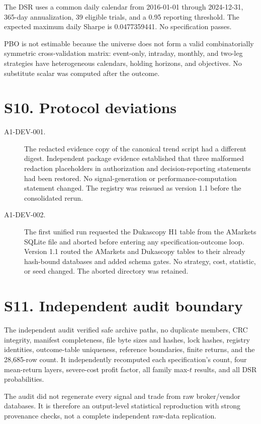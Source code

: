 \documentclass[a4paper,fleqn]{cas-sc}
\begin{document}
The DSR uses a common daily calendar from 2016-01-01 through 2024-12-31, 365-day annualization, 39 eligible trials, and a 0.95 reporting threshold. The expected maximum daily Sharpe is 0.0477359441. No specification passes.



PBO is not estimable because the universe does not form a valid combinatorially symmetric cross-validation matrix: event-only, intraday, monthly, and two-leg strategies have heterogeneous calendars, holding horizons, and objectives. No substitute scalar was computed after the outcome.

\section*{S10. Protocol deviations}

\begin{description}
\item[A1-DEV-001.] The redacted evidence copy of the canonical trend script had a different digest. Independent package evidence established that three malformed redaction placeholders in authorization and decision-reporting statements had been restored. No signal-generation or performance-computation statement changed. The registry was reissued as version 1.1 before the consolidated rerun.
\item[A1-DEV-002.] The first unified run requested the Dukascopy H1 table from the AMarkets SQLite file and aborted before entering any specification-outcome loop. Version 1.1 routed the AMarkets and Dukascopy tables to their already hash-bound databases and added schema gates. No strategy, cost, statistic, or seed changed. The aborted directory was retained.
\end{description}

\section*{S11. Independent audit boundary}

The independent audit verified safe archive paths, no duplicate members, CRC integrity, manifest completeness, file byte sizes and hashes, lock hashes, registry identities, outcome-table uniqueness, reference boundaries, finite returns, and the 28,685-row count. It independently recomputed each specification's count, four mean-return layers, severe-cost profit factor, all family max-$t$ results, and all DSR probabilities.

The audit did not regenerate every signal and trade from raw broker/vendor databases. It is therefore an output-level statistical reproduction with strong provenance checks, not a complete independent raw-data replication.
\end{document}

